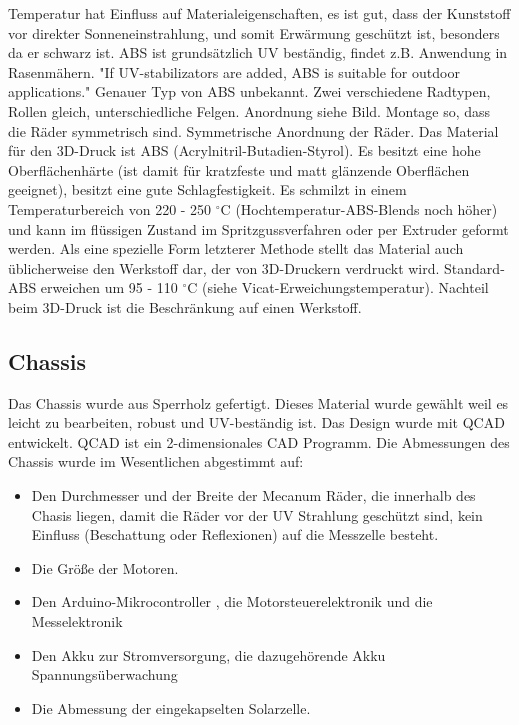 \documentclass[a4paper,bibtotoc,oneside]{scrbook}
\begin{document}
Temperatur hat Einfluss auf Materialeigenschaften, es ist gut, dass der Kunststoff vor direkter Sonneneinstrahlung, und somit Erwärmung geschützt ist, besonders da er schwarz ist.
ABS ist grundsätzlich UV beständig, findet z.B. Anwendung in Rasenmähern. "If UV-stabilizators are added, ABS is suitable for outdoor applications." 
Genauer Typ von ABS unbekannt. 
Zwei verschiedene Radtypen, Rollen gleich, unterschiedliche Felgen. Anordnung siehe Bild. Montage so, dass die Räder symmetrisch sind. Symmetrische Anordnung der Räder.
Das Material für den 3D-Druck ist ABS (Acrylnitril-Butadien-Styrol). Es besitzt eine hohe Oberflächenhärte (ist damit für kratzfeste und matt glänzende Oberflächen geeignet), besitzt eine gute Schlagfestigkeit. Es schmilzt in einem Temperaturbereich von 220 - 250 $^\circ$C (Hochtemperatur-ABS-Blends noch höher) und kann im flüssigen Zustand im Spritzgussverfahren oder per Extruder geformt werden. Als eine spezielle Form letzterer Methode stellt das Material auch üblicherweise den Werkstoff dar, der von 3D-Druckern verdruckt wird. Standard-ABS erweichen um 95 - 110 $^\circ$C (siehe Vicat-Erweichungstemperatur). 
Nachteil beim 3D-Druck ist die Beschränkung auf einen Werkstoff. 


\subsection{Chassis}\thispagestyle{empty}

\noindent Das Chassis wurde aus Sperrholz gefertigt. Dieses Material wurde gewählt weil es leicht zu bearbeiten, robust und UV-beständig ist. Das Design wurde mit QCAD entwickelt. QCAD ist ein 2-dimensionales CAD Programm. 
Die Abmessungen des Chassis wurde im Wesentlichen abgestimmt auf: \begin{itemize}
\item Den Durchmesser und der Breite der Mecanum Räder, die innerhalb des Chasis liegen, damit die Räder vor der UV Strahlung geschützt sind, kein Einfluss (Beschattung oder Reflexionen) auf die Messzelle besteht.
\item Die Größe der Motoren.
\item Den Arduino-Mikrocontroller , die Motorsteuerelektronik und die Messelektronik
\item Den Akku zur Stromversorgung, die dazugehörende Akku Spannungsüberwachung 
\item Die Abmessung der eingekapselten Solarzelle.
 \end{itemize}
\end{document}
